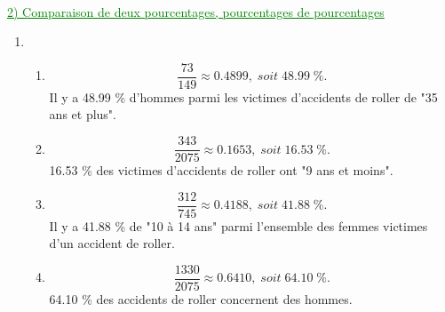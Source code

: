 \documentclass[xcolor={dvipsnames}]{beamer}
\begin{document}
\begin{frame}
\

%

\textcolor{Green}{\underline{2) Comparaison de deux pourcentages, pourcentages de pourcentages}}
\end{frame}



\begin{frame}{}

\begin{enumerate}%
	\item 
	\begin{enumerate} [a]
		\item \begin{equation*}
		\dfrac{73}{149} \approx \num{0.4899},\; soit\; \num{48.99}\; \%.
		\end{equation*}
		Il y a \num{48.99} \% d'hommes parmi les victimes d'accidents de roller de "35 ans et plus".\pause
		
		\item \begin{equation*}
		\dfrac{343}{2075} \approx \num{0.1653},\; soit\; \num{16.53}\; \%.
		\end{equation*}
		\num{16.53} \% des victimes d'accidents de roller ont "9 ans et moins".\pause
		
		\item \begin{equation*}
		\dfrac{312}{745} \approx \num{0.4188},\; soit\; \num{41.88}\; \%.
		\end{equation*}
		Il y a \num{41.88} \% de "10 à 14 ans" parmi l'ensemble des femmes victimes d'un accident de roller.\pause
		
		\item \begin{equation*}
		\dfrac{1330}{2075} \approx \num{0.6410},\; soit\; \num{64.10}\; \%.
		\end{equation*}
		\num{64.10} \% des accidents de roller concernent des hommes.
	\end{enumerate}
\end{enumerate}
\end{frame}
\end{document}
